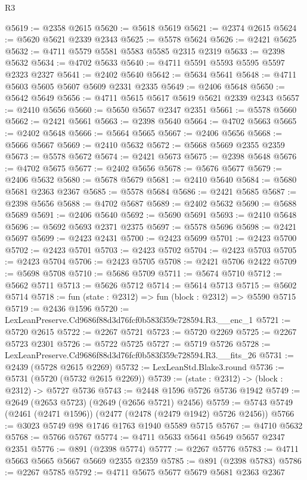 \begin{lexlean}{R3}
\begin{coremodule}
@5619 := @2358 @2615
@5620 := @5618 @5619
@5621 := @2374 @2615
@5624 := @5620 @5621 @2339 @2343
@5625 := @5578 @5624
@5626 := @2421 @5625
@5632 := @4711 @5579 @5581 @5583 @5585 @2315 @2319
@5633 := @2398 @5632
@5634 := @4702 @5633
@5640 := @4711 @5591 @5593 @5595 @5597 @2323 @2327
@5641 := @2402 @5640
@5642 := @5634 @5641
@5648 := @4711 @5603 @5605 @5607 @5609 @2331 @2335
@5649 := @2406 @5648
@5650 := @5642 @5649
@5656 := @4711 @5615 @5617 @5619 @5621 @2339 @2343
@5657 := @2410 @5656
@5660 := @5650 @5657 @2347 @2351
@5661 := @5578 @5660
@5662 := @2421 @5661
@5663 := @2398 @5640
@5664 := @4702 @5663
@5665 := @2402 @5648
@5666 := @5664 @5665
@5667 := @2406 @5656
@5668 := @5666 @5667
@5669 := @2410 @5632
@5672 := @5668 @5669 @2355 @2359
@5673 := @5578 @5672
@5674 := @2421 @5673
@5675 := @2398 @5648
@5676 := @4702 @5675
@5677 := @2402 @5656
@5678 := @5676 @5677
@5679 := @2406 @5632
@5680 := @5678 @5679
@5681 := @2410 @5640
@5684 := @5680 @5681 @2363 @2367
@5685 := @5578 @5684
@5686 := @2421 @5685
@5687 := @2398 @5656
@5688 := @4702 @5687
@5689 := @2402 @5632
@5690 := @5688 @5689
@5691 := @2406 @5640
@5692 := @5690 @5691
@5693 := @2410 @5648
@5696 := @5692 @5693 @2371 @2375
@5697 := @5578 @5696
@5698 := @2421 @5697
@5699 := @2423 @2431
@5700 := @2423 @5699
@5701 := @2423 @5700
@5702 := @2423 @5701
@5703 := @2423 @5702
@5704 := @2423 @5703
@5705 := @2423 @5704
@5706 := @2423 @5705
@5708 := @2421 @5706 @2422
@5709 := @5698 @5708
@5710 := @5686 @5709
@5711 := @5674 @5710
@5712 := @5662 @5711
@5713 := @5626 @5712
@5714 := @5614 @5713
@5715 := @5602 @5714
@5718 := fun (state : @2312) => fun (block : @2312) => @5590 @5715
@5719 := @2436 @1596
@5720 := LexLeanPreserve.Cd9686f88d3d76fcf0b583f359c728594.R3.__enc_1
@5721 := @5720 @2615
@5722 := @2267 @5721
@5723 := @5720 @2269
@5725 := @2267 @5723 @2301
@5726 := @5722 @5725
@5727 := @5719 @5726
@5728 := LexLeanPreserve.Cd9686f88d3d76fcf0b583f359c728594.R3.__fits_26
@5731 := @2439 (@5728 @2615 @2269)
@5732 := LexLeanStd.Blake3.round
@5736 := @5731 (@5720 (@5732 @2615 @2269))
@5739 := (state : @2312) -> (block : @2312) -> @5727 @5736
@5743 := @2448 @1596 @5726 @5736 @1942
@5749 := @2649 (@2653 @5723) (@2649 (@2656 @5721) @2456)
@5759 := @5743 @5749 (@2461 (@2471 @1596)) (@2477 (@2478 (@2479 @1942) @5726 @2456))
@5766 := @3023 @5749 @98 @1746 @1763 @1940 @5589 @5715
@5767 := @4710 @5632
@5768 := @5766 @5767
@5774 := @4711 @5633 @5641 @5649 @5657 @2347 @2351
@5776 := @891 (@2398 @5774)
@5777 := @2267 @5776
@5783 := @4711 @5663 @5665 @5667 @5669 @2355 @2359
@5785 := @891 (@2398 @5783)
@5786 := @2267 @5785
@5792 := @4711 @5675 @5677 @5679 @5681 @2363 @2367

\end{coremodule}
\end{lexlean}
